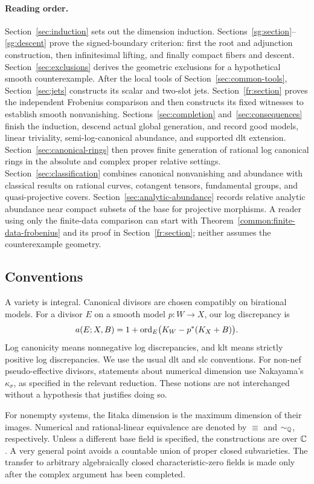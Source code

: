 \paragraph{Reading order.}
Section~\ref{sec:induction} sets out the dimension induction.
Sections~\ref{sg:section}--\ref{sg:descent} prove the signed-boundary criterion:
first the root and adjunction construction, then infinitesimal lifting, and
finally compact fibers and descent. Section~\ref{sec:exclusions} derives the
geometric exclusions for a hypothetical smooth counterexample.
After the local tools of Section~\ref{sec:common-tools},
Section~\ref{sec:jets} constructs its scalar and two-slot jets.
Section~\ref{fr:section} proves the independent Frobenius comparison and
then constructs its fixed witnesses to establish smooth nonvanishing.
Sections~\ref{sec:completion} and~\ref{sec:consequences} finish the induction,
descend actual global generation, and record good models, linear triviality,
semi-log-canonical abundance, and supported dlt extension.
Section~\ref{sec:canonical-rings} then proves finite generation of rational
log canonical rings in the absolute and complex proper relative settings.
Section~\ref{sec:classification} combines canonical nonvanishing and
abundance with classical results on rational curves, cotangent tensors,
fundamental groups, and quasi-projective covers.
Section~\ref{sec:analytic-abundance} records relative analytic abundance
near compact subsets of the base for projective morphisms.
A reader using only the finite-data comparison can start with
Theorem~\ref{common:finite-data-frobenius} and its proof in
Section~\ref{fr:section}; neither assumes the counterexample geometry.

\subsection{Conventions}

A variety is integral. Canonical divisors are chosen compatibly on
birational models. For a divisor \(E\) on a smooth model
\(p:W\to X\), our log discrepancy is
\[
 a(E;X,B)=1+\operatorname{ord}_E\bigl(K_W-p^*(K_X+B)\bigr).
\]
Log canonicity means nonnegative log discrepancies, and klt means
strictly positive log discrepancies. We use the usual dlt and slc
conventions. For non-nef pseudo-effective divisors, statements
about numerical dimension use Nakayama's \(\kappa_\sigma\), as
specified in the relevant reduction. These notions are not
interchanged without a hypothesis that justifies doing so.

For nonempty systems, the Iitaka dimension is the maximum dimension of
their images. Numerical and rational-linear equivalence
are denoted by \(\equiv\) and \(\sim_{\mathbb{Q}}\), respectively. Unless a
different base field is specified, the constructions are over \(\mathbb{C}\).
A very general point avoids a countable union of proper closed
subvarieties. The transfer to arbitrary algebraically closed
characteristic-zero fields is made only after the complex argument
has been completed.
